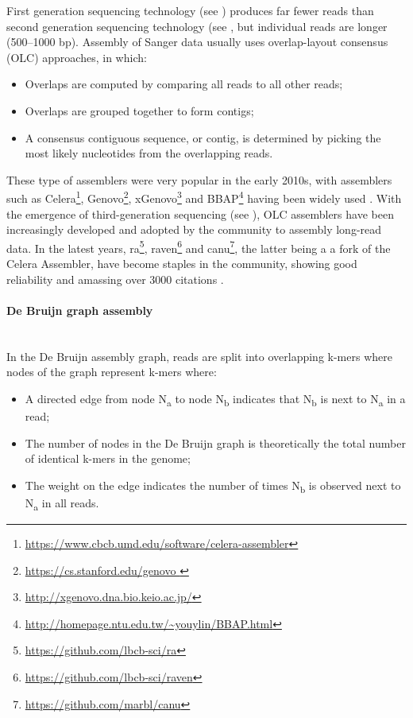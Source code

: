 First generation sequencing technology (see ) produces far fewer reads than second generation sequencing technology (see , but individual reads are longer (500–1000 bp). 
Assembly of Sanger data usually uses overlap-layout consensus (OLC) approaches, in which:

\begin{itemize}
    \item Overlaps are computed by comparing all reads to all other reads;
    \item Overlaps are grouped together to form contigs;
    \item A consensus contiguous sequence, or contig, is determined by picking the most likely nucleotides from the overlapping reads.
\end{itemize}

These type of assemblers were very popular in the early 2010s, with assemblers such as Celera\footnote{\url{https://www.cbcb.umd.edu/software/celera-assembler}},  Genovo\footnote{\url{https://cs.stanford.edu/genovo }}, xGenovo\footnote{\url{http://xgenovo.dna.bio.keio.ac.jp/}} and BBAP\footnote{\url{http://homepage.ntu.edu.tw/~youylin/BBAP.html}} having been widely used \citep{myers_whole-genome_2000, hutchison_genovo_2010, afiahayati_extended_2013, lin_novo_2017}.
With the emergence of third-generation sequencing (see ), OLC assemblers have been increasingly developed and adopted by the community to assembly long-read data. 
In the latest years, ra\footnote{\url{https://github.com/lbcb-sci/ra}}, raven\footnote{\url{https://github.com/lbcb-sci/raven}} and canu\footnote{\url{https://github.com/marbl/canu}}, the latter being a a fork of the Celera Assembler, have become staples in the community, showing good reliability and amassing over 3000 citations \citep{vaser_yet_2019, koren_canu_2017, wick_benchmarking_2021}.  %

\paragraph{De Bruijn graph assembly} \label{sssec:dbg_assembly} \mbox{}\\

In the De Bruijn assembly graph, reads are split into overlapping k-mers where nodes of the graph represent k-mers where:

\begin{itemize}
    \item A directed edge from node N\textsubscript{a} to node N\textsubscript{b} indicates that N\textsubscript{b} is next to N\textsubscript{a} in a read;
    \item The number of nodes in the De Bruijn graph is theoretically the total number of identical k-mers in the genome;
    \item The weight on the edge indicates the number of times  N\textsubscript{b} is observed next to  N\textsubscript{a} in all reads.
\end{itemize}

